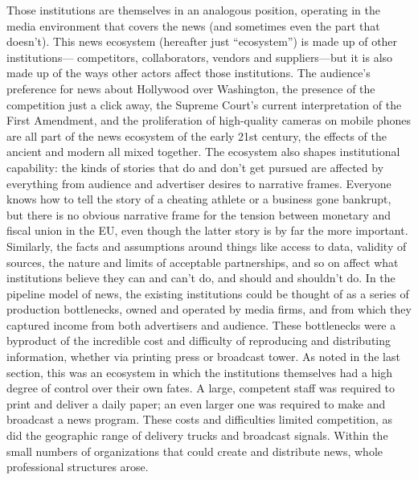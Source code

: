 Those institutions are themselves in an analogous position, operating in the media
environment that covers the news (and sometimes even the part that doesn’t).
This news ecosystem (hereafter just ``ecosystem'') is made up of other institutions—
competitors, collaborators, vendors and suppliers—but it is also made up
of the ways other actors affect those institutions. The audience’s preference for
news about Hollywood over Washington, the presence of the competition just a
click away, the Supreme Court’s current interpretation of the First Amendment,
and the proliferation of high-quality cameras on mobile phones are all part of the
news ecosystem of the early 21st century, the effects of the ancient and modern
all mixed together.
The ecosystem also shapes institutional capability: the kinds of stories that do and
don’t get pursued are affected by everything from audience and advertiser desires
to narrative frames. Everyone knows how to tell the story of a cheating athlete or
a business gone bankrupt, but there is no obvious narrative frame for the tension
between monetary and fiscal union in the EU, even though the latter story is by
far the more important. Similarly, the facts and assumptions around things like
access to data, validity of sources, the nature and limits of acceptable partnerships,
and so on affect what institutions believe they can and can’t do, and should and
shouldn’t do.
In the pipeline model of news, the existing institutions could be thought of as a
series of production bottlenecks, owned and operated by media firms, and from
which they captured income from both advertisers and audience. These bottlenecks
were a byproduct of the incredible cost and difficulty of reproducing and
distributing information, whether via printing press or broadcast tower. As noted
in the last section, this was an ecosystem in which the institutions themselves had
a high degree of control over their own fates.
A large, competent staff was required to print and deliver a daily paper; an even
larger one was required to make and broadcast a news program. These costs and
difficulties limited competition, as did the geographic range of delivery trucks
and broadcast signals. Within the small numbers of organizations that could create
and distribute news, whole professional structures arose.

